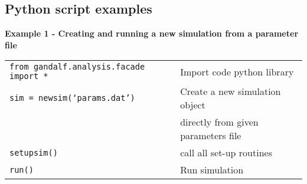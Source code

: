 \documentclass[a4paper]{article}
\newcommand{\var}[1]{\texttt{#1}}
\begin{document}




\newpage 
\subsection{Python script examples}


{\bf Example 1 - Creating and running a new simulation from a parameter file} \\
\newline
\begin{tabular}{p{8.0cm}p{7.0cm}}
\var{from gandalf.analysis.facade import *}& Import code python library \\
\var{sim = newsim(`params.dat')}           & Create a new simulation object \\
                                           & directly from given parameters file \\
\var{setupsim()}                           & call all set-up routines \\
\var{run()}                                & Run simulation
\end{tabular}
\vspace{1cm}
\end{document}
